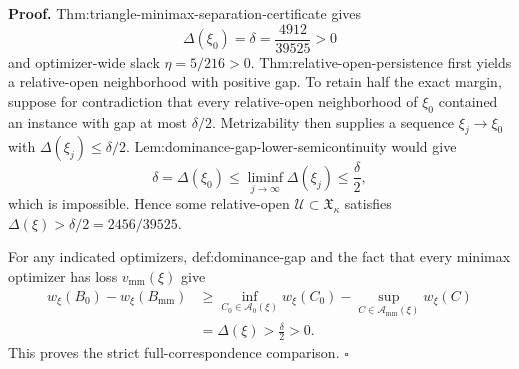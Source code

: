\textbf{Proof.}
Thm:triangle-minimax-separation-certificate gives
\[
\Delta(\xi_0)=\delta=\frac{4912}{39525}>0
\]
and optimizer-wide slack \(\eta=5/216>0\).  Thm:relative-open-persistence first yields a relative-open neighborhood with positive gap.  To retain half the exact margin, suppose for contradiction that every relative-open neighborhood of \(\xi_0\) contained an instance with gap at most \(\delta/2\).  Metrizability then supplies a sequence \(\xi_j\to\xi_0\) with \(\Delta(\xi_j)\le\delta/2\).  Lem:dominance-gap-lower-semicontinuity would give
\[
\delta=\Delta(\xi_0)
\le\liminf_{j\to\infty}\Delta(\xi_j)
\le\frac\delta2,
\]
which is impossible.  Hence some relative-open \(\mathcal U\subset\mathfrak X_\kappa\) satisfies \(\Delta(\xi)>\delta/2=2456/39525\).

For any indicated optimizers, def:dominance-gap and the fact that every minimax optimizer has loss \(v_{\mathrm{mm}}(\xi)\) give
\[
\begin{aligned}
w_\xi(B_0)-w_\xi(B_{\mathrm{mm}})
&\ge
\inf_{C_0\in\mathcal A_0(\xi)}w_\xi(C_0)
-\sup_{C\in\mathcal A_{\mathrm{mm}}(\xi)}w_\xi(C)\\
&=\Delta(\xi)>\frac\delta2>0.
\end{aligned}
\]
This proves the strict full-correspondence comparison. \(\square\)